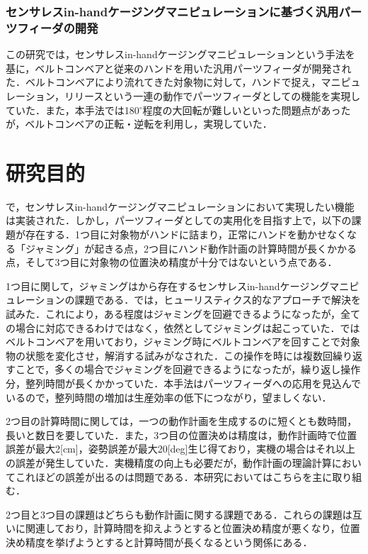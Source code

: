 \documentclass[a4paper,twoside,12pt,papersize, dvipdfmx]{iirthesis}
\begin{document}
\subsubsection{センサレスin-handケージングマニピュレーションに基づく汎用パーツフィーダの開発 \cite{kamikukita2022}}
この研究では，センサレスin-handケージングマニピュレーションという手法を基に，ベルトコンベアと従来のハンドを用いた汎用パーツフィーダが開発された．ベルトコンベアにより流れてきた対象物に対して，ハンドで捉え，マニピュレーション，リリースという一連の動作でパーツフィーダとしての機能を実現していた．また，本手法では180$^\circ$程度の大回転が難しいといった問題点があったが，ベルトコンベアの正転・逆転を利用し，実現していた．

\section{研究目的}\label{sec::intro::objective}
\cite{komiyama2021}で，センサレスin-handケージングマニピュレーションにおいて実現したい機能は実装された．しかし，パーツフィーダとしての実用化を目指す上で，以下の課題が存在する．1つ目に対象物がハンドに詰まり，正常にハンドを動かせなくなる「ジャミング」が起きる点，2つ目にハンド動作計画の計算時間が長くかかる点，そして3つ目に対象物の位置決め精度が十分ではないという点である．\par

1つ目に関して，ジャミングは\cite{asamura2013}から存在するセンサレスin-handケージングマニピュレーションの課題である．\cite{komiyama2021}では，ヒューリスティクス的なアプローチで解決を試みた．これにより，ある程度はジャミングを回避できるようになったが，全ての場合に対応できるわけではなく，依然としてジャミングは起こっていた．\cite{kamikukita2022}ではベルトコンベアを用いており，ジャミング時にベルトコンベアを回すことで対象物の状態を変化させ，解消する試みがなされた．この操作を時には複数回繰り返すことで，多くの場合でジャミングを回避できるようになったが，繰り返し操作分，整列時間が長くかかっていた．本手法はパーツフィーダへの応用を見込んでいるので，整列時間の増加は生産効率の低下につながり，望ましくない．

2つ目の計算時間に関しては，一つの動作計画を生成するのに短くとも数時間，長いと数日を要していた．また，3つ目の位置決めは精度は，動作計画時で位置誤差が最大2[cm]，姿勢誤差が最大20[deg]生じ得ており，実機の場合はそれ以上の誤差が発生していた．実機精度の向上も必要だが，動作計画の理論計算においてこれほどの誤差が出るのは問題である．本研究においてはこちらを主に取り組む．

2つ目と3つ目の課題はどちらも動作計画に関する課題である．これらの課題は互いに関連しており，計算時間を抑えようとすると位置決め精度が悪くなり，位置決め精度を挙げようとすると計算時間が長くなるという関係にある．
\end{document}
